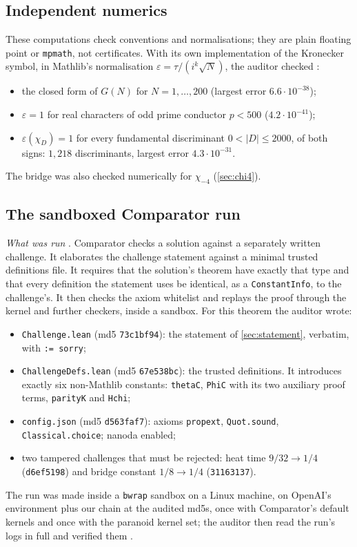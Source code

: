 \documentclass[11pt]{article}
\theoremstyle{definition}
\newcommand{\lean}[1]{\texttt{#1}}
\begin{document}
\subsection{Independent numerics}

These computations check conventions and normalisations; they are plain floating point or \lean{mpmath}, not certificates. With its own implementation of the Kronecker symbol, in Mathlib's normalisation $\varepsilon = \tau/(i^k\sqrt N)$, the auditor checked \cite[\S A.7]{bbrecords}:
\begin{itemize}
\item the closed form of $G(N)$ for $N = 1, \dots, 200$ (largest error $6.6\cdot10^{-38}$);
\item $\varepsilon = 1$ for real characters of odd prime conductor $p < 500$ ($4.2\cdot10^{-41}$);
\item $\varepsilon(\chi_D) = 1$ for every fundamental discriminant $0 < |D| \le 2000$, of both signs: $1{,}218$ discriminants, largest error $4.3\cdot10^{-31}$.
\end{itemize}
The bridge was also checked numerically for $\chi_{-4}$ (\cref{sec:chi4}).

\subsection{The sandboxed Comparator run}\label{sec:comparator}

\noindent
\emph{What was run} \cite[COMPARATOR\_RUN\_SPEC]{bbrecords}. Comparator \cite{Comparator} checks a solution against a separately written challenge. It elaborates the challenge statement against a minimal trusted definitions file. It requires that the solution's theorem have exactly that type and that every definition the statement uses be identical, as a \lean{ConstantInfo}, to the challenge's. It then checks the axiom whitelist and replays the proof through the kernel and further checkers, inside a sandbox. For this theorem the auditor wrote:
\begin{itemize}
\item \lean{Challenge.lean} (md5 \lean{73c1bf94}): the statement of \cref{sec:statement}, verbatim, with \lean{:= sorry};
\item \lean{ChallengeDefs.lean} (md5 \lean{67e538bc}): the trusted definitions. It introduces exactly six non-Mathlib constants: \lean{thetaC}, \lean{PhiC} with its two auxiliary proof terms, \lean{parityK} and \lean{Hchi};
\item \lean{config.json} (md5 \lean{d563faf7}): axioms \lean{propext}, \lean{Quot.sound}, \lean{Classical.choice}; nanoda enabled;
\item two tampered challenges that must be rejected: heat time $9/32 \to 1/4$ (\lean{d6ef5198}) and bridge constant $1/8 \to 1/4$ (\lean{31163137}).
\end{itemize}
The run was made inside a \lean{bwrap} sandbox on a Linux machine, on OpenAI's environment plus our chain at the audited md5s, once with Comparator's default kernels and once with the paranoid kernel set; the auditor then read the run's logs in full and verified them \cite[REVIEW\_COMPARATOR\_LAMBDA\_CHI and its Addendum~1]{bbrecords}.
\end{document}
